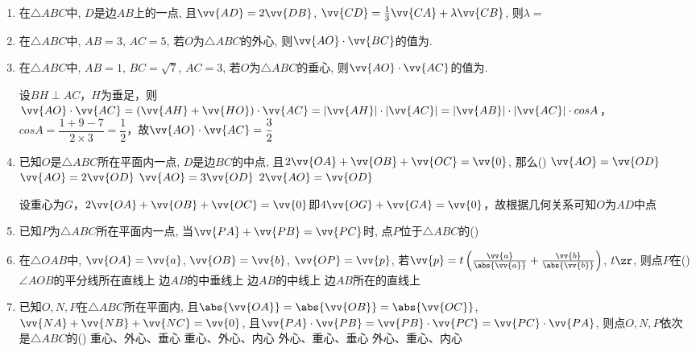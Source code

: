 \begin{enumerate}
    
    \item 在$\triangle{ABC}$中, $D$是边$AB$上的一点, 且$\vv{AD}=2\vv{DB}$, $\vv{CD}=\frac{1}{3}\vv{CA}+\lambda\vv{CB}$, 则$\lambda=$
    
    \item 在$\triangle{ABC}$中, $AB=3$, $AC=5$, 若$O$为$\triangle{ABC}$的外心, 则$\vv{AO}\cdot\vv{BC}$的值为. 
    
    \item 在$\triangle{ABC}$中, $AB=1$, $BC=\sqrt{7}$, $AC=3$, 若$O$为$\triangle{ABC}$的垂心, 则$\vv{AO}\cdot\vv{AC}$的值为. 
    \begin{jieda}
        设$BH \perp AC$，$H$为垂足，则$\vv{AO} \cdot \vv{AC} = (\vv{AH} + \vv{HO}) \cdot \vv{AC} = |\vv{AH}| \cdot |\vv{AC}| = |\vv{AB}| \cdot |\vv{AC}| \cdot cosA$， $cosA = \dfrac{1+9-7}{2\times 3} = \dfrac{1}{2}$，故$\vv{AO}\cdot\vv{AC} = \dfrac{3}{2}$
    \end{jieda}
    
    
    \item 已知$O$是$\triangle{ABC}$所在平面内一点, $D$是边$BC$的中点, 且$2\vv{OA}+\vv{OB}+\vv{OC}=\vv{0}$, 那么\dotfill()
    \xx
    {$\vv{AO}=\vv{OD}$}
    {$\vv{AO}=2\vv{OD}$}
    {$\vv{AO}=3\vv{OD}$}
    {$2\vv{AO}=\vv{OD}$}
    \begin{jieda}
        设重心为$G$，$2\vv{OA}+\vv{OB}+\vv{OC}=\vv{0}$即$4\vv{OG} + \vv{GA} = \vv{0}$，故根据几何关系可知$O$为$AD$中点
    \end{jieda}
    
    \item 已知$P$为$\triangle{ABC}$所在平面内一点, 当$\vv{PA}+\vv{PB}=\vv{PC}$时, 点$P$位于$\triangle{ABC}$的\dotfill()
    
    
    \item 在$\triangle{OAB}$中, $\vv{OA}=\vv{a}$, $\vv{OB}=\vv{b}$, $\vv{OP}=\vv{p}$, 
    若$\vv{p}=t\left(\frac{\vv{a}}{\abs{\vv{a}}}+\frac{\vv{b}}{\abs{\vv{b}}}\right)$, $t\zr$, 则点$P$在\dotfill()
    \xx
    {$\angle{AOB}$的平分线所在直线上}
    {边$AB$的中垂线上}
    {边$AB$的中线上}
    {边$AB$所在的直线上}
    
    
    \item 已知$O,N,P$在$\triangle{ABC}$所在平面内, 且$\abs{\vv{OA}}=\abs{\vv{OB}}=\abs{\vv{OC}}$, $\vv{NA}+\vv{NB}+\vv{NC}=\vv{0}$, 
    且$\vv{PA}\cdot\vv{PB}=\vv{PB}\cdot\vv{PC}=\vv{PC}\cdot\vv{PA}$, 则点$O,N,P$依次是$\triangle{ABC}$的\dotfill()
    \xx
    {重心、外心、垂心}
    {重心、外心、内心}
    {外心、重心、垂心}
    {外心、重心、内心}
\end{enumerate}